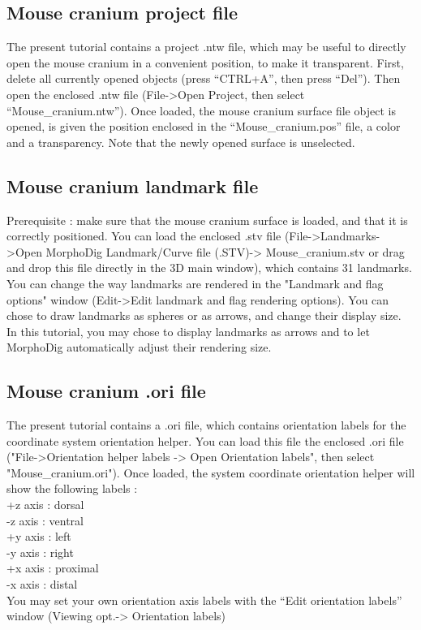 \documentclass[12pt, a4paper]{book}
\begin{document}
\subsection{Mouse cranium project file}
The present tutorial contains a project .ntw file, which may be useful to directly open the mouse
cranium in a convenient position, to make it transparent. First, delete all currently opened objects
(press “CTRL+A”, then press “Del”). Then open the enclosed .ntw file (File->Open Project, then select
“Mouse\_cranium.ntw”). Once loaded, the mouse cranium surface file object is opened, is given the position
enclosed in the “Mouse\_cranium.pos” file, a color and a transparency. Note that the newly opened
surface is unselected.



\subsection{Mouse cranium landmark file}
Prerequisite : make sure that the mouse cranium surface is loaded, and that it is correctly positioned. You
can load the enclosed .stv file (File->Landmarks->Open MorphoDig Landmark/Curve file (.STV)-> Mouse\_cranium.stv or drag and drop this file directly in the 3D main window), which contains 31 landmarks. You can change the way landmarks are rendered in the "Landmark and flag options" window
(Edit->Edit landmark and flag rendering options). You can chose to draw landmarks as spheres or as arrows, and change
their display size. In this tutorial, you may chose to display landmarks as arrows and to let MorphoDig automatically adjust their rendering size.

\subsection{Mouse cranium .ori file}
The present tutorial contains a .ori file, which contains orientation labels for the coordinate system
orientation helper. You can load this file the enclosed .ori file ("File->Orientation helper labels -> Open Orientation labels", then select
"Mouse\_cranium.ori"). Once loaded, the system coordinate orientation helper will show the following
labels :\\
+z axis : dorsal\\
-z axis : ventral\\
+y axis : left\\
-y axis : right\\
+x axis : proximal\\
-x axis : distal\\
You may set your own orientation axis labels with the “Edit orientation labels” window (Viewing opt.-> Orientation labels)
\end{document}
